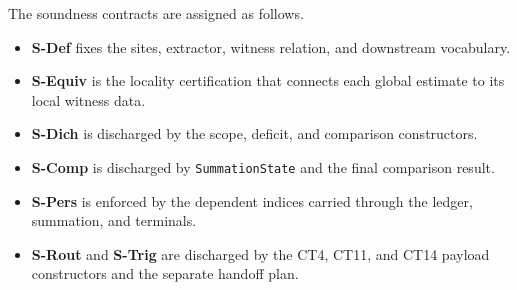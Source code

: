 The soundness contracts are assigned as follows.
\begin{itemize}
\tightlist
\item \textbf{S-Def} fixes the sites, extractor, witness relation, and downstream vocabulary.
\item \textbf{S-Equiv} is the locality certification that connects each global estimate to its local witness data.
\item \textbf{S-Dich} is discharged by the scope, deficit, and comparison constructors.
\item \textbf{S-Comp} is discharged by \texttt{SummationState} and the final comparison result.
\item \textbf{S-Pers} is enforced by the dependent indices carried through the ledger, summation, and terminals.
\item \textbf{S-Rout} and \textbf{S-Trig} are discharged by the CT4, CT11, and CT14 payload constructors and the separate handoff plan.
\end{itemize}

